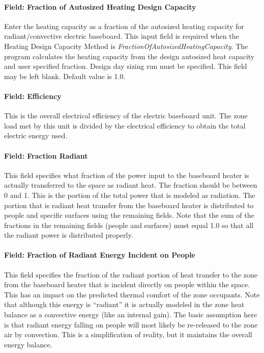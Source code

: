 \paragraph{Field: Fraction of Autosized Heating Design Capacity}\label{field-fraction-of-autosized-heating-design-capacity-2}

Enter the heating capacity as a fraction of the autosized heating capacity for radiant/convective electric baseboard. This input field is required when the Heating Design Capacity Method is \emph{FractionOfAutosizedHeatingCapacity}. The program calculates the heating capacity from the design autosized heat capacity and user specified fraction. Design day sizing run must be specified. This field may be left blank. Default value is 1.0.

\paragraph{Field: Efficiency}\label{field-efficiency-001}

This is the overall electrical efficiency of the electric baseboard unit. The zone load met by this unit is divided by the electrical efficiency to obtain the total electric energy used.

\paragraph{Field: Fraction Radiant}\label{field-fraction-radiant-2-000}

This field specifies what fraction of the power input to the baseboard heater is actually transferred to the space as radiant heat. The fraction should be between 0 and 1. This is the portion of the total power that is modeled as radiation. The portion that is radiant heat transfer from the baseboard heater is distributed to people and specific surfaces using the remaining fields. Note that the sum of the fractions in the remaining fields (people and surfaces) must equal 1.0 so that all the radiant power is distributed properly.

\paragraph{Field: Fraction of Radiant Energy Incident on People}\label{field-fraction-of-radiant-energy-incident-on-people-2}

This field specifies the fraction of the radiant portion of heat transfer to the zone from the baseboard heater that is incident directly on people within the space. This has an impact on the predicted thermal comfort of the zone occupants. Note that although this energy is ``radiant'' it is actually modeled in the zone heat balance as a convective energy (like an internal gain). The basic assumption here is that radiant energy falling on people will most likely be re-released to the zone air by convection. This is a simplification of reality, but it maintains the overall energy balance.


